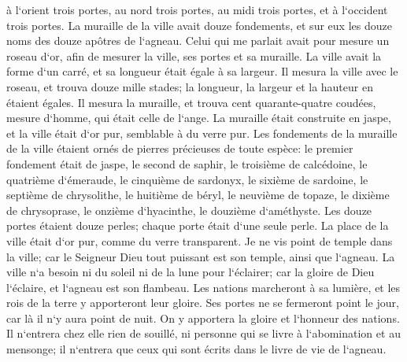 \verse à l`orient trois portes, au nord trois portes, au midi trois portes, et à l`occident trois portes. 
\verse La muraille de la ville avait douze fondements, et sur eux les douze noms des douze apôtres de l`agneau. 
\verse Celui qui me parlait avait pour mesure un roseau d`or, afin de mesurer la ville, ses portes et sa muraille. 
\verse La ville avait la forme d`un carré, et sa longueur était égale à sa largeur. Il mesura la ville avec le roseau, et trouva douze mille stades; la longueur, la largeur et la hauteur en étaient égales. 
\verse Il mesura la muraille, et trouva cent quarante-quatre coudées, mesure d`homme, qui était celle de l`ange. 
\verse La muraille était construite en jaspe, et la ville était d`or pur, semblable à du verre pur. 
\verse Les fondements de la muraille de la ville étaient ornés de pierres précieuses de toute espèce: le premier fondement était de jaspe, le second de saphir, le troisième de calcédoine, le quatrième d`émeraude, 
\verse le cinquième de sardonyx, le sixième de sardoine, le septième de chrysolithe, le huitième de béryl, le neuvième de topaze, le dixième de chrysoprase, le onzième d`hyacinthe, le douzième d`améthyste. 
\verse Les douze portes étaient douze perles; chaque porte était d`une seule perle. La place de la ville était d`or pur, comme du verre transparent. 
\verse Je ne vis point de temple dans la ville; car le Seigneur Dieu tout puissant est son temple, ainsi que l`agneau. 
\verse La ville n`a besoin ni du soleil ni de la lune pour l`éclairer; car la gloire de Dieu l`éclaire, et l`agneau est son flambeau. 
\verse Les nations marcheront à sa lumière, et les rois de la terre y apporteront leur gloire. 
\verse Ses portes ne se fermeront point le jour, car là il n`y aura point de nuit. 
\verse On y apportera la gloire et l`honneur des nations. 
\verse Il n`entrera chez elle rien de souillé, ni personne qui se livre à l`abomination et au mensonge; il n`entrera que ceux qui sont écrits dans le livre de vie de l`agneau. 

